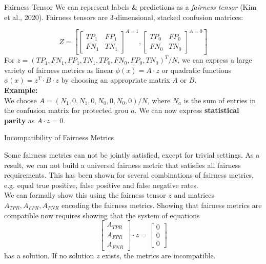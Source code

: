 \documentclass[11pt,compress,t,notes=noshow, xcolor=table]{beamer}
\begin{document}
\begin{vbframe}{Fairness Tensor}
  We can represent labels \& predictions as a \emph{fairness tensor} (Kim et al., 2020).
  Fairness tensors are 3-dimensional, stacked confusion matrices:

  \[
  Z = \left[
    \begin{bmatrix}
    TP_1  & FP_1 \\
    FN_1  & TN_1
    \end{bmatrix} ^{A=1}
    ,
    \begin{bmatrix}
      TP_0  & FP_0 \\
      FN_0  & TN_0
    \end{bmatrix} ^{A=0} 
    \right]
  \]
  \vspace{.2cm}
  For $z = (TP_1,FN_1,FP_1,TN_1,TP_0,FN_0,FP_0,TN_0)^T / N$, we can express a large variety of fairness metrics as 
  linear $\phi(x) = A \cdot z$ or quadratic functions $\phi(x) = z^T \cdot B \cdot z$ by choosing an appropriate matrix $A$ or $B$. \\
  \vspace{.2cm}
  \textbf{Example:} \\ We choose $A = (N_1, 0, N_1, 0, N_0, 0, N_0, 0) / N$, where $N_{a}$ is the sum of entries in the confusion matrix for protected grou $a$.
  We can now express \textbf{statistical parity} as $A \cdot z = 0$.
\end{vbframe}
\begin{vbframe}{Incompatibility of Fairness Metrics}

  Some fairness metrics can not be jointly satisfied, except for trivial settings.
  As a result, we can not build a universal fairness metric that satisfies all fairness requirements.
  This has been shown for several combinations of fairness metrics, e.g. equal true positive, false positive and false negative rates.\\
  \vspace{.2cm}
  We can formally show this using the fairness tensor $z$ and matrices $A_{TPR}, A_{FPR}, A_{FNR}$ encoding the fairness metrics.
  Showing that fairness metrics are compatible now requires showing that the system of equations 
  \[ \begin{bmatrix} A_{TPR} \\ A_{FPR} \\ A_{FNR} \end{bmatrix} \cdot z  = \begin{bmatrix} 0 \\ 0 \\ 0 \end{bmatrix} \]
  has a solution. If no solution $z$ exists, the metrics are incompatible.

\end{vbframe}
\end{document}
